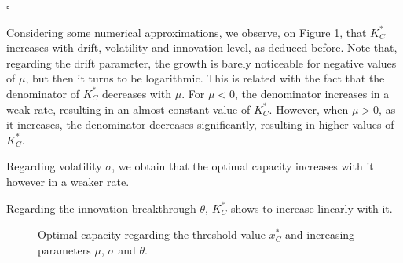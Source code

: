 \begin{flushright}
	$\square$
\end{flushright}


Considering some numerical approximations, we observe, on Figure \ref{fig:k1}, that $K^*_C$ increases with drift, volatility and innovation level, as deduced before. Note that, regarding the drift parameter, the growth is barely noticeable for negative values of $\mu$, but then it turns to be logarithmic.
This is related with the fact that the denominator of $K_C^*$ decreases with $\mu$. For $\mu<0$, the denominator increases in a weak rate, resulting in an almost constant value of $K^*_C$. However, when $\mu>0$, as it increases, the denominator decreases significantly, resulting in higher values of $K^*_C$.

Regarding volatility $\sigma$, we obtain that the optimal capacity increases with it however in a weaker rate.

Regarding the innovation breakthrough $\theta$, $K^*_C$ shows to increase linearly with it.

\begin{figure}[!htb]
	\begin{subfigmatrix}{3}
	\end{subfigmatrix}
	\caption{Optimal capacity regarding the threshold value $x^*_C$ and increasing parameters $\mu$, $\sigma$ and $\theta$.}
	\label{fig:k1}
\end{figure}

